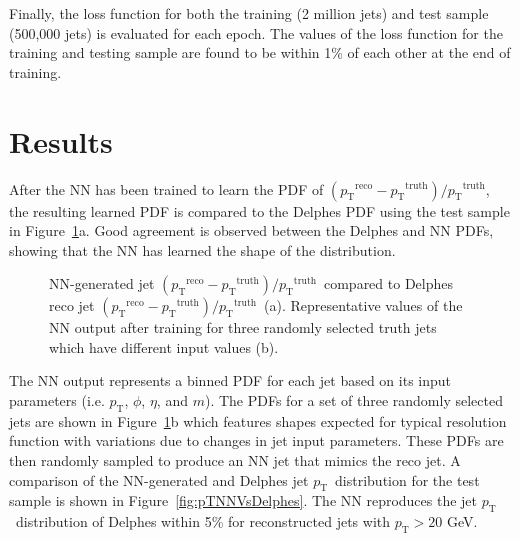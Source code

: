 \documentclass[showpacs,showkeys,preprint,prd,nofootinbib,linenumbers,12pt,superscriptaddress]{revtex4-1}
\def\pt{\ensuremath{p_{\mathrm{T}}}}
\def\ptRes{\ensuremath{(\pt^{\mathrm{reco}}-\pt^{\mathrm{truth}})/\pt^{\mathrm{truth}}}}
\begin{document}
Finally, the loss function for both the training (2 million jets) and test sample (500,000 jets) is evaluated for each epoch. The values of the loss function for the training and testing sample are found to be within 1\% of each other at the end of training. 


\FloatBarrier
\section{Results}
\label{sec:results}

After the NN has been trained to learn the PDF of \ptRes, the resulting learned PDF is compared to the Delphes PDF using the test sample in Figure~\ref{fig:PDFComp}a. Good agreement is observed between the Delphes and NN PDFs, showing that the NN has learned the shape of the distribution.

\begin{figure}[htb]
  \caption{NN-generated jet \ptRes\ compared to Delphes reco jet \ptRes\ (a). Representative values of the NN output after training for three randomly selected truth jets which have different input values (b).}
  \label{fig:PDFComp}
\end{figure}

The NN output represents a binned PDF for each jet based on its input parameters (i.e. \pt, $\phi$, $\eta$, and $m$). The PDFs for a set of three randomly selected jets are shown in Figure~\ref{fig:PDFComp}b which features shapes expected for typical resolution function with variations due to changes in jet input parameters. These PDFs are then randomly sampled to produce an NN jet that mimics the reco jet. A comparison of the NN-generated and Delphes jet \pt\ distribution for the test sample is shown in Figure~\ref{fig:pTNNVsDelphes}. The NN reproduces the jet \pt\ distribution of Delphes within 5\% for reconstructed jets with $\pt>20$ GeV. 
\end{document}
